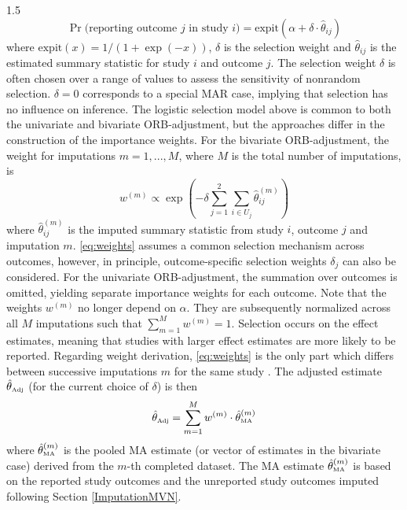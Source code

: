 \documentclass{article}
\begin{document}
\begin{spacing}{1.5}
\begin{equation} \label{eq:selection}
\Pr\mbox{(reporting outcome $j$ in study $i$)} = \text{expit} \left( \alpha + \delta \cdot \hat\theta_{ij} \right)
\end{equation}
where $\text{expit}(x) = 1/(1+\exp(-x))$, $\delta$ is the selection weight and $\hat\theta_{ij}$ is the estimated summary statistic for study $i$ and outcome $j$. The selection weight $\delta$ is often chosen over a range of values to assess the sensitivity of nonrandom selection. $\delta = 0$ corresponds to a special MAR case, implying that selection has no influence on inference. The logistic selection model above is common to both the univariate and bivariate ORB-adjustment, but the approaches differ in the construction of the importance weights. For the bivariate ORB-adjustment, the weight for imputations $m = 1, ..., M$, where $M$ is the total number of imputations, is 
\begin{equation} \label{eq:weights}
w^{(m)} \propto \exp \left( -\delta \sum_{j=1}^{2}  \sum_{i \in U_j} \hat\theta^{(m)}_{ij} \right)
\end{equation}
where $\hat\theta^{(m)}_{ij}$ is the imputed summary statistic from study $i$, outcome $j$ and imputation $m$. 
\eqref{eq:weights} assumes a common selection mechanism across outcomes, however, in principle, outcome-specific selection weights $\delta_j$ can also be considered. For the univariate ORB-adjustment, the summation over outcomes is omitted, yielding separate importance weights for each outcome. Note that the weights $w^{(m)}$ no longer depend on $\alpha$. They are subsequently normalized across all $M$ imputations such that $\sum_{m=1}^{M} w^{(m)} = 1$. Selection occurs on the effect estimates, meaning that studies with larger effect estimates are more likely to be reported. 
Regarding weight derivation, \eqref{eq:weights} is the only part which differs between successive imputations $m$ for the same study \cite[web appendix]{carpenter2011assessing}.  The adjusted estimate $\hat\theta_{\tiny{\mbox{Adj}}}$ (for the current choice of $\delta$) is then 
\begin{equation} \label{eq:weightedAverage}
\hat\theta_{\tiny{\mbox{Adj}}} = \sum^{M}_{m = 1} w^{(m)} \cdot \hat\theta^{(m)}_{\tiny{\mbox{MA}}} 
\end{equation}
where $\hat\theta^{(m)}_{\tiny{\mbox{MA}}}$ is the pooled MA estimate (or vector of estimates in the bivariate case) derived from the $m$-th completed dataset. The MA estimate $\hat\theta^{(m)}_{\tiny{\mbox{MA}}}$ is based on the reported study outcomes and the unreported study outcomes imputed following Section \ref{ImputationMVN}. %


\end{spacing}
\end{document}
